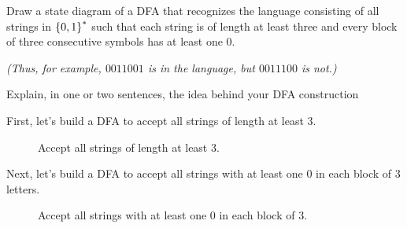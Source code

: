 \begin{problem}
Draw a state diagram of a DFA that recognizes the language consisting of all strings
in $\left\{0, 1\right\}^*$ such that each string is of length at least three
and every block of three consecutive symbols has at least one $0$.

\noindent
\emph{(Thus, for example, $0011001$ is in the language, but $0011100$ is not.)}

\step
Explain, in one or two sentences, the idea behind your DFA construction
\end{problem}

\begin{Answer}

  First, let's build a DFA to accept all strings of length at least $3$.

  \begin{figure}[H]
    \centering
    \caption{Accept all strings of length at least $3$.}
    \label{fig:at-least-3}
  \end{figure}

  \step
  Next, let's build a DFA to accept all strings with at least one $0$ in each block of $3$ letters.

  \begin{figure}[H]
    \centering
    \caption{Accept all strings with at least one $0$ in each block of $3$.}
    \label{fig:at-least-0ne-0-in-each-block-of-3}
  \end{figure}


\end{Answer}
